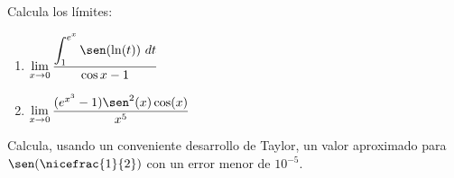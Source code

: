 \documentclass[12pt]{article}
\begin{document}
    \begin{ejercicio}
        Calcula los límites:
        \begin{enumerate}
            \item $\displaystyle \lim_{x\to 0}\dfrac{\displaystyle\int_1^{e^x}\sen(\ln(t))~dt}{\cos x-1}$
            \item $\displaystyle \lim_{x\to 0}\dfrac{(e^{x^3}-1)\sen^2(x)\cos(x)}{x^5}$
        \end{enumerate}
    \end{ejercicio}

    \begin{ejercicio}
        Calcula, usando un conveniente desarrollo de Taylor, un valor aproximado para $\sen(\nicefrac{1}{2})$ con un error menor de $10^{-5}$.
    \end{ejercicio}
   
\end{document}
